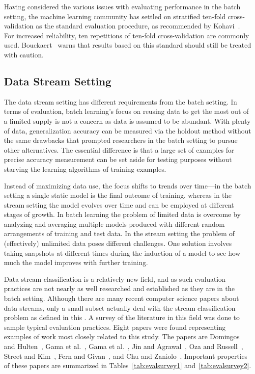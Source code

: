 
Having considered the various issues with evaluating performance in the batch setting, the machine learning community has settled on stratified ten-fold cross-validation as the standard evaluation procedure, as recommended by Kohavi~\cite{cvstudy}. For increased reliability, ten repetitions of ten-fold cross-validation are commonly used. Bouckaert~\cite{remco_choose} warns that results based on this standard should still be treated with caution.

\subsection{Data Stream Setting}
\label{sec:dsevalsurvey}

The data stream setting has different requirements from the batch setting. In terms of evaluation, batch learning's focus on reusing data to get the most out of a limited supply is not a concern as data is assumed to be abundant. With plenty of data, generalization accuracy can be measured via the holdout method without the same drawbacks that prompted researchers in the batch setting to pursue other alternatives. The essential difference is that a large set of examples for precise accuracy measurement can be set aside for testing purposes without starving the learning algorithms of training examples.

Instead of maximizing data use, the focus shifts to trends over time---in the batch setting a single static model is the final outcome of training, whereas in the stream setting the model evolves over time and can be employed at different stages of growth.
In batch learning the problem of limited data is overcome by analyzing and averaging multiple models produced with different random arrangements of training and test data. In the stream setting the problem of (effectively) unlimited data poses different challenges. One solution involves taking  snapshots at different times during the induction of a model to see how much the model improves with further training. 

Data stream classification is a relatively new field, and as such evaluation practices are not nearly as well researched and established as they are in the batch setting. Although there are many recent computer science papers about data streams, only a small subset actually deal with the stream classification problem as defined in this \thesisc. A survey of the literature in this field was done to sample typical evaluation practices. Eight papers were found representing examples of work most closely related to this study. The papers are Domingos and Hulten~\cite{vfdt}, Gama et al.~\cite{vfdtc}, Gama et al.~\cite{ufft}, Jin and Agrawal~\cite{nip}, Oza and Russell~\cite{ozaexp}, Street and Kim~\cite{sea}, Fern and Givan~\cite{branchpred}, and Chu and Zaniolo~\cite{fastlightboost}. Important properties of these papers are summarized in Tables~\ref{tab:evalsurvey1} and~\ref{tab:evalsurvey2}.

